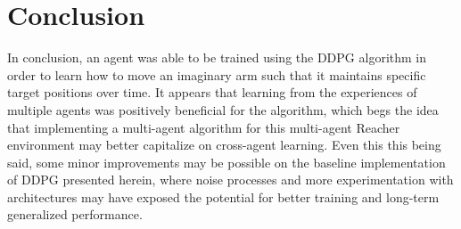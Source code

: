 \documentclass[11pt]{article}
\begin{document}
\section{Conclusion}

In conclusion, an agent was able to be trained using the DDPG algorithm in order to learn how to move an imaginary arm such that it maintains specific target positions over time. It appears that learning from the experiences of multiple agents was positively beneficial for the algorithm, which begs the idea that implementing a multi-agent algorithm for this multi-agent Reacher environment may better capitalize on cross-agent learning. Even this this being said, some minor improvements may be possible on the baseline implementation of DDPG presented herein, where noise processes and more experimentation with architectures may have exposed the potential for better training and long-term generalized performance.



\end{document}
